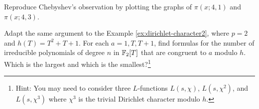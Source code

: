\begin{exercise}\sage
    Reproduce Chebyshev's observation by plotting the graphs of $\pi(x;4,1)$ and $\pi(x;4,3)$.
\end{exercise}

\begin{exercise}
    Adapt the same argument to the Example \ref{ex:dirichlet-character2}, where $p = 2$ and $h(T) = T^2 + T + 1$.
    For each $a = 1, T, T + 1$, find formulas for the number of irreducible polynomials of degree $n$ in $\mathbb{F}_2[T]$ that are congruent to $a$ modulo $h$.
    Which is the largest and which is the smallest?\footnote{Hint: You may need to consider three $L$-functions $L(s, \chi)$, $L(s, \chi^2)$, and $L(s, \chi^3)$ where $\chi^3$ is the trivial Dirichlet character modulo $h$.}
\end{exercise}
